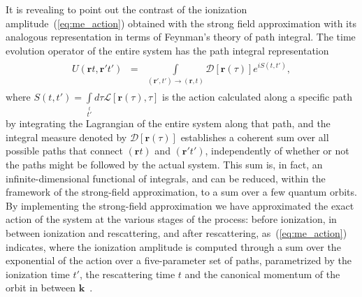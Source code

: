 It is revealing to point out the contrast of the ionization
amplitude~(\ref{eq:me_action}) obtained with the strong field
approximation with its analogous representation in terms of Feynman's
theory of path integral. The time evolution operator of the entire
system has the path integral representation
\begin{eqnarray}
\label{eq:te_path}
\begin{split}
U(\mathbf{r}t, \mathbf{r}'t') & = &
\int\limits_{(\mathbf{r}',t')\to(\mathbf{r},t)}
\mathcal{D}\left[ \mathbf{r}(\tau) \right] e^{i S(t, t')},
\end{split}
\end{eqnarray}
where $S(t, t') = \int\limits_{t'}\limits^{t} d\tau
\mathcal{L}[\mathbf{r}(\tau), \tau]$ is the action calculated along a
specific path by integrating the Lagrangian of the entire system along
that path, and the integral measure denoted by $\mathcal{D}\left[
  \mathbf{r}(\tau) \right]$ establishes a coherent sum over all
possible paths that connect $(\mathbf{r}t)$ and $(\mathbf{r}'t')$,
independently of whether or not the paths might be followed by the
actual system. This sum is, in fact, an infinite-dimensional
functional of integrals, and can be reduced, within the framework of
the strong-field approximation, to a sum over a few quantum orbits. By
implementing the strong-field approximation we have approximated the
exact action of the system at the various stages of the process:
before ionization, in between ionization and rescattering, and after
rescattering, as~(\ref{eq:me_action}) indicates, where the ionization
amplitude is computed through a sum over the exponential of the action
over a five-parameter set of paths, parametrized by the ionization
time $t'$, the rescattering time $t$ and the canonical momentum of the
orbit in between $\mathbf{k}$~\cite{KopoldOptComm2000}.

